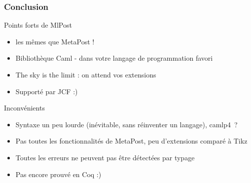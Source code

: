 \documentclass[nodefaultblocks]{beamer}
\begin{document}
\begin{frame}\frametitle{Conclusion}

  \begin{block}{Points forts de MlPost}
    \begin{itemize}
      \item les mêmes que MetaPost ! 
      \item Bibliothèque Caml - dans votre langage de programmation favori
      \item The sky is the limit : on attend vos extensions
      \item Supporté par JCF  :)
    \end{itemize}
  \end{block}
  
  \begin{block}{Inconvénients}
    \begin{itemize}
      \item Syntaxe un peu lourde (inévitable, sans réinventer un langage),
        camlp4~?
      \item Pas toutes les fonctionnalités de MetaPost, peu d'extensions
        comparé à Tikz
      \item Toutes les erreurs ne peuvent pas être détectées par typage
      \item Pas encore prouvé en Coq :)
    \end{itemize}
  \end{block}
\end{frame}
\end{document}
